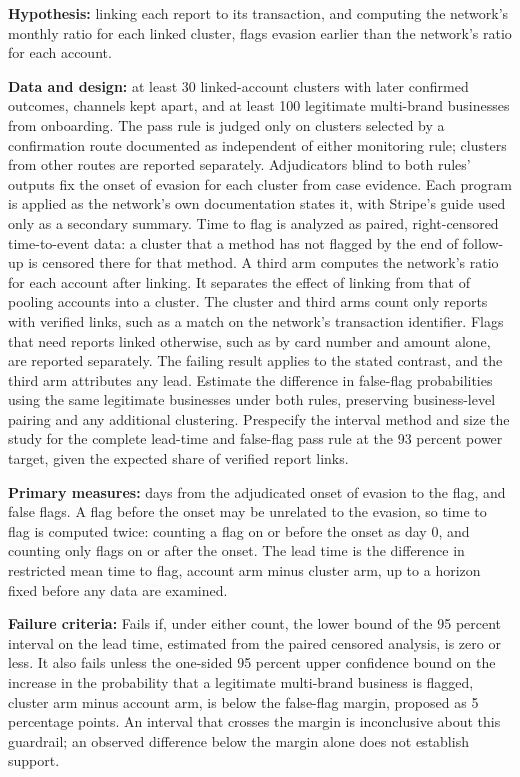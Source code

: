 \documentclass[
  11pt,
]{article}
\begin{document}
\textbf{Hypothesis:} linking each report to its transaction, and
computing the network's monthly ratio for each linked cluster, flags
evasion earlier than the network's ratio for each account.

\textbf{Data and design:} at least 30 linked-account clusters with later
confirmed outcomes, channels kept apart, and at least 100 legitimate
multi-brand businesses from onboarding. The pass rule is judged only on
clusters selected by a confirmation route documented as independent of
either monitoring rule; clusters from other routes are reported
separately. Adjudicators blind to both rules' outputs fix the onset of
evasion for each cluster from case evidence. Each program is applied as
the network's own documentation states it, with Stripe's guide used only
as a secondary summary. Time to flag is analyzed as paired,
right-censored time-to-event data: a cluster that a method has not
flagged by the end of follow-up is censored there for that method. A
third arm computes the network's ratio for each account after linking.
It separates the effect of linking from that of pooling accounts into a
cluster. The cluster and third arms count only reports with verified
links, such as a match on the network's transaction identifier. Flags
that need reports linked otherwise, such as by card number and amount
alone, are reported separately. The failing result applies to the stated
contrast, and the third arm attributes any lead. Estimate the difference
in false-flag probabilities using the same legitimate businesses under
both rules, preserving business-level pairing and any additional
clustering. Prespecify the interval method and size the study for the
complete lead-time and false-flag pass rule at the 93 percent power
target, given the expected share of verified report links.

\textbf{Primary measures:} days from the adjudicated onset of evasion to
the flag, and false flags. A flag before the onset may be unrelated to
the evasion, so time to flag is computed twice: counting a flag on or
before the onset as day 0, and counting only flags on or after the
onset. The lead time is the difference in restricted mean time to flag,
account arm minus cluster arm, up to a horizon fixed before any data are
examined.

\textbf{Failure criteria:} Fails if, under either count, the lower bound
of the 95 percent interval on the lead time, estimated from the paired
censored analysis, is zero or less. It also fails unless the one-sided
95 percent upper confidence bound on the increase in the probability
that a legitimate multi-brand business is flagged, cluster arm minus
account arm, is below the false-flag margin, proposed as 5 percentage
points. An interval that crosses the margin is inconclusive about this
guardrail; an observed difference below the margin alone does not
establish support.
\end{document}
